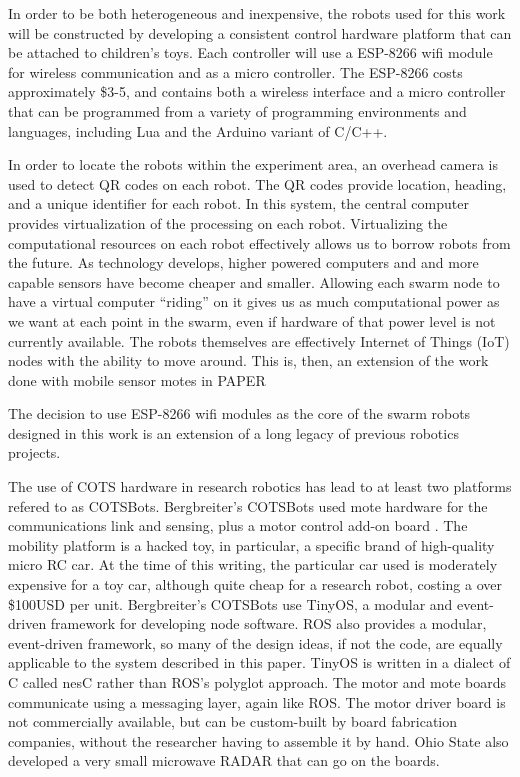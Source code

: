 \documentclass[]{article}
\begin{document}
In order to be both heterogeneous and inexpensive, the robots used for this work will be constructed by developing a consistent control hardware platform that can be attached to children's toys. 
Each controller will use a ESP-8266 wifi module for wireless communication and as a micro controller. 
The ESP-8266 costs approximately \$3-5, and contains both a wireless interface and a micro controller that can be programmed from a variety of programming environments and languages, including Lua and the Arduino variant of C/C++. 

In order to locate the robots within the experiment area, an overhead camera is used to detect QR codes on each robot. 
The QR codes provide location, heading, and a unique identifier for each robot. 
In this system, the central computer provides virtualization of the processing on each robot. 
Virtualizing the computational resources on each robot effectively allows us to borrow robots from the future. 
As technology develops, higher powered computers and and more capable sensors have become cheaper and smaller. 
Allowing each swarm node to have a virtual computer ``riding'' on it gives us as much computational power as we want at each point in the swarm, even if hardware of that power level is not currently available.
The robots themselves are effectively Internet of Things (IoT) nodes with the ability to move around. 
This is, then, an extension of the work done with mobile sensor motes in PAPER

The decision to use ESP-8266 wifi modules as the core of the swarm robots designed in this work is an extension of a long legacy of previous robotics projects. 

The use of COTS hardware in research robotics has lead to at least two platforms refered to as COTSBots.
Bergbreiter's COTSBots used mote hardware for the communications link and sensing, plus a motor control add-on board  \cite{bergbreiter2003cotsbots}. 
The mobility platform is a hacked toy, in particular, a specific brand of high-quality micro RC car.
At the time of this writing, the particular car used is moderately expensive for a toy car, although quite cheap for a research robot, costing a over \$100USD per unit. 
Bergbreiter's COTSBots use TinyOS, a modular and event-driven framework for developing node software. 
ROS also provides a modular, event-driven framework, so many of the design ideas, if not the code, are equally applicable to the system described in this paper. 
TinyOS is written in a dialect of C called nesC rather than ROS's polyglot approach. The motor and mote boards communicate using a messaging layer, again like ROS. 
The motor driver board is not commercially available, but can be custom-built by board fabrication companies, without the researcher having to assemble it by hand. 
Ohio State also developed a very small microwave RADAR that can go on the boards.
\end{document}
